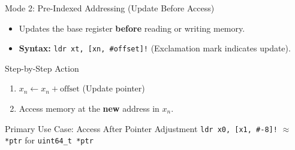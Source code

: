 \documentclass[aspectratio=169,11pt,t]{beamer}
\newcommand{\key}[1]{\textbf{#1}}
\newcommand{\code}[1]{\texttt{#1}}
\begin{document}

\begin{frame}{Mode 2: Pre-Indexed Addressing (Update Before Access)}

\begin{itemize}\setlength{\itemsep}{5pt}
  \item Updates the base register \key{before} reading or writing memory.
  \item \key{Syntax:} \code{ldr xt, [xn, \#offset]!} \quad (Exclamation mark indicates update).
\end{itemize}

\vspace{0.2cm}
\begin{block}{Step-by-Step Action}
\begin{enumerate}\setlength{\itemsep}{3pt}
  \item $x_n \leftarrow x_n + \text{offset}$ \quad (Update pointer)
  \item Access memory at the \key{new} address in $x_n$.
\end{enumerate}
\end{block}

\vspace{0.25cm}
\begin{block}{Primary Use Case: Access After Pointer Adjustment}
\code{ldr x0, [x1, \#-8]!} \quad $\approx$ \quad \code{*\char45{}ptr} for \code{uint64\_t *ptr} \\
\end{block}
\end{frame}

\end{document}
